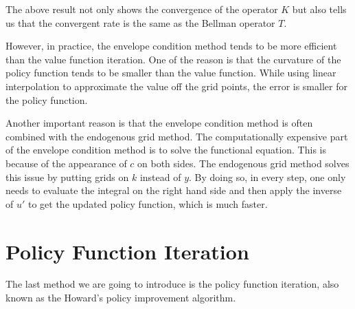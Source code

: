 \documentclass[12pt]{article}
\begin{document}
The above result not only shows the convergence of the
operator $K$ but also tells us that the convergent rate 
is the same as the Bellman operator $T$. 

However, in practice, the envelope condition method tends 
to be more efficient than the value function iteration. 
One of the reason is that the curvature of the policy 
function tends to be smaller than the value function. 
While using linear interpolation to approximate the 
value off the grid points, the error is smaller for
the policy function. 

Another important reason is that the envelope condition 
method is often combined with the endogenous grid method. 
The computationally expensive part of the envelope 
condition method is to solve the functional equation. 
This is because of the appearance of $c$ on both sides. 
The endogenous grid method solves this issue by putting 
grids on $k$ instead of $y$. By doing so, in every step, 
one only needs to evaluate the integral on the right hand 
side and then apply the inverse of $u'$ to get the 
updated policy function, which is much faster.

\section{Policy Function Iteration}
The last method we are going to introduce is the policy 
function iteration, also known as the Howard's policy 
improvement algorithm. 
\end{document}
